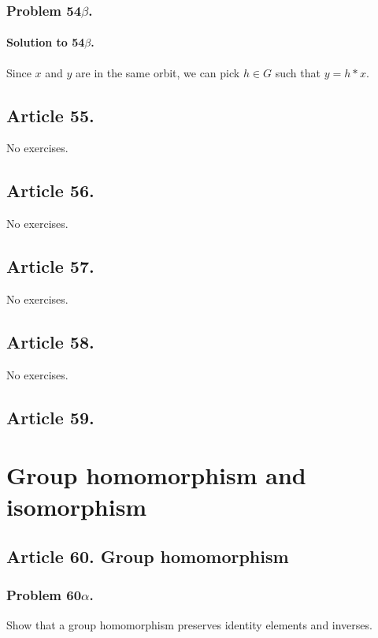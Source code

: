 \subsubsection{Problem 54$\beta$.}

\paragraph*{Solution to 54$\beta$.}
Since $x$ and $y$ are in the same orbit, we can pick $h \in G$ such that
$ y = h*x $.
\subsection{Article 55.}

No exercises.

\subsection{Article 56.}

No exercises.

\subsection{Article 57.}

No exercises.

\subsection{Article 58.}

No exercises.

\subsection{Article 59.}


\section{Group homomorphism and isomorphism}


\subsection{Article 60. Group homomorphism}
\subsubsection{Problem 60$\alpha$.}
Show that a group homomorphism preserves identity elements and inverses.

